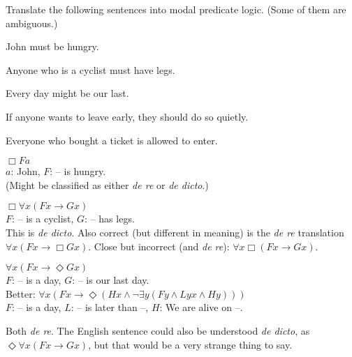 \begin{exercise}
  Translate the following sentences into modal predicate logic. (Some of them
  are ambiguous.)
  \begin{exlist}
  \item John must be hungry.
  \item Anyone who is a cyclist must have legs.
  \item Every day might be our last.
  \item If anyone wants to leave early, they should do so quietly.
  \item Everyone who bought a ticket is allowed to enter.
  \end{exlist}
\end{exercise}
\begin{solution}

  \begin{sollist}
    \item $\Box Fa$ \\ $a$: John, $F$: -- is hungry.\\[1mm]
    (Might be classified as either \emph{de re} or \emph{de dicto}.)\\[-2mm]
    
  \item $\Box \forall x(Fx \to Gx)$ \\ $F$: -- is a cyclist, $G$: -- has legs.\\[1mm]
    This is \emph{de dicto}. Also correct (but different in meaning) is the \emph{de re} translation $\forall x (Fx \to \Box Gx)$.
    Close but incorrect (and \emph{de re}): $\forall x \Box(Fx \to Gx)$.\\[-2mm] 
    
  \item $\forall x (Fx \to \Diamond Gx)$ \\ $F$: -- is a day, $G$: -- is our last day.\\[1mm]
  Better:
  $\forall x (Fx \to \Diamond (Hx \land \neg \exists y(Fy \land Lyx \land Hy)))$ \\ $F$: -- is a day, $L$: -- is later than --, $H$: We are alive on --.
  
    Both \emph{de re}. The English sentence could also be understood \emph{de dicto}, as 
    $\Diamond \forall x (Fx \to Gx)$, but that would be a very strange
    thing to say.\\[-2mm]
    

\end{sollist}
\end{solution}
